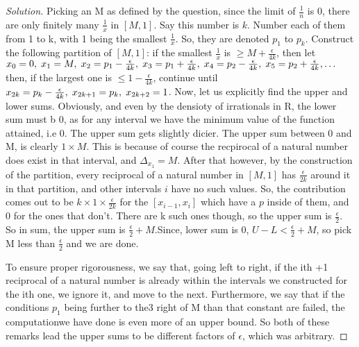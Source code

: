 \documentclass{article}
\newenvironment{problem}[2][Problem]{\begin{trivlist}
\item[\hskip \labelsep {\bfseries #1}\hskip \labelsep {\bfseries #2.}]}{\end{trivlist}}
\newenvironment{solution}{\begin{proof}[Solution]}{\end{proof}}
\begin{document}
\begin{problem}{1}
\end{problem}
\begin{solution}
	Picking an M as defined by the question, since the limit of $\frac{1}{n}$ is 0, there are only finitely many $\frac{1}{x}$ in $[M, 1]$. Say this number is $k$. Number each of them from 1 to k, with 1 being the smallest $\frac{1}{x}$. So, they are denoted $p_1$ to $p_k$. Construct the following partition of $[M,1]$: if the smallest $\frac{1}{x}$ is $\geq M+\frac{\epsilon}{4k}$, then let $x_0 = 0, \hspace{1mm} x_1 = M, \hspace{1mm} x_2 = p_1 - \frac{\epsilon}{4k}, \hspace{1mm} x_3 = p_1 + \frac{\epsilon}{4k}, \hspace{1mm} x_4 = p_2 - \frac{\epsilon}{4k}, \hspace{1mm} x_5 = p_2 +\frac{\epsilon}{4k}, \dots $ then, if the largest one is $\leq 1 -\frac{\epsilon}{4k}$, continue until $x_{2k} = p_k -\frac{\epsilon}{4k}, \hspace{1mm} x_{2k+1} = p_k, \hspace{1mm} x_{2k+2} = 1$. Now, let us explicitly find the upper and lower sums. Obviously, and even by the densioty of irrationals in R, the lower sum must b 0, as for any interval we have the minimum value of the function attained, i.e 0. The upper sum gets slightly dicier. The upper sum between 0 and M, is clearly $1\times M$. This is because of course the recpirocal of a natural number does exist in that interval, and $\Delta_{x_{1}} = M$. After that however, by the construction of the partition, every reciprocal of a natural number in $[M,1]$ has $\frac{\epsilon}{2k}$ around it in that partition, and other intervals $i$ have no such values. So, the contribution comes out to be $k\times 1\times \frac{\epsilon}{2k}$ for the $[x_{i-1}, x_{i}]$ which have a $p$ inside of them, and 0 for the ones that don't. There are k such ones though, so the upper sum is $\frac{\epsilon}{2}$. So in sum, the upper sum is $\frac{\epsilon}{2} +M$.Since, lower sum is 0, $U - L < \frac{\epsilon}{2}+M$, so pick M less than $\frac{\epsilon}{2}$ and we are done.

To ensure proper rigorousness, we say that, going left to right, if the ith +1 reciprocal of a natural number is already within the intervals we constructed for the ith one, we ignore it, and move to the next. Furthermore, we say that if the conditions $p_1$ being further to the3 right of M than that constant are failed, the computationwe have done is even more of an upper bound. So both of these remarks lead the upper sums to be different factors of $\epsilon$, which was arbitrary.
 

\end{solution}

\begin{problem}{2}
\end{problem}
\end{document}
